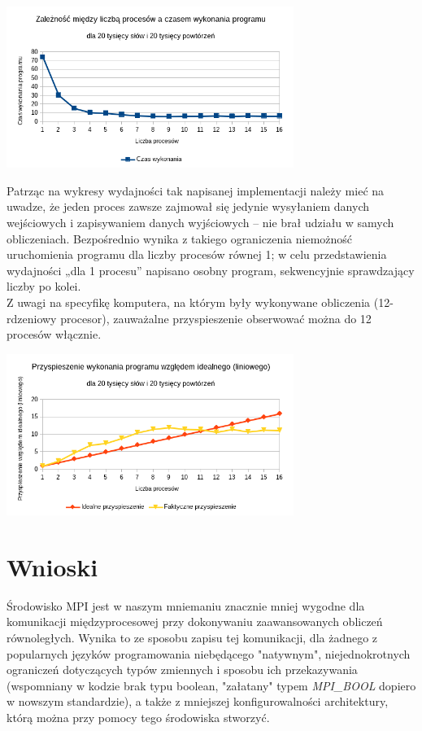 \documentclass[a4paper,12pt]{article}
\begin{document}
\begin{center}
\includegraphics[width=0.7\textwidth]{data/wykonanieProgramu.png}
\end{center}

Patrząc na wykresy wydajności tak napisanej implementacji należy mieć na uwadze, że jeden proces zawsze zajmował się jedynie wysyłaniem danych wejściowych i zapisywaniem danych wyjściowych – nie brał udziału w samych obliczeniach. Bezpośrednio wynika z takiego ograniczenia niemożność uruchomienia programu dla liczby procesów równej 1; w celu przedstawienia wydajności „dla 1 procesu” napisano osobny program, sekwencyjnie sprawdzający liczby po kolei. \\

Z uwagi na specyfikę komputera, na którym były wykonywane obliczenia (12-rdzeniowy procesor), zauważalne przyspieszenie obserwować można do 12 procesów włącznie.

\begin{center}
\includegraphics[width=0.7\textwidth]{data/przyspieszenie.png}
\end{center}

\section*{Wnioski}
Środowisko MPI jest w naszym mniemaniu znacznie mniej wygodne dla komunikacji międzyprocesowej przy dokonywaniu zaawansowanych obliczeń równoległych. Wynika to ze sposobu zapisu tej komunikacji, dla żadnego z popularnych języków programowania niebędącego "natywnym", niejednokrotnych ograniczeń dotyczących typów zmiennych i sposobu ich przekazywania (wspomniany w kodzie brak typu boolean, "załatany" typem \emph{MPI\_BOOL} dopiero w nowszym standardzie), a także z mniejszej konfigurowalności architektury, którą można przy pomocy tego środowiska stworzyć.
\end{document}
